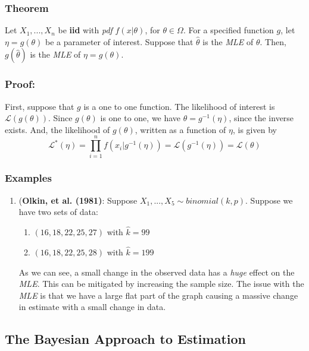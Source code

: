 \documentclass{article}
\begin{document}
\subsubsection{Theorem}
Let $X_1,...,X_n$ be \textbf{iid} with \textit{pdf} $f(x|\theta)$, for $\theta \in \Omega$. For a specified function $g$, let $\eta = g(\theta)$ be a parameter of interest. Suppose that $\hat{\theta}$ is the \textit{MLE} of $\theta$. Then, $g(\hat{\theta})$ is the \textit{MLE} of $\eta = g(\theta)$.

\subsubsection*{Proof:}
First, suppose that $g$ is a one to one function. The likelihood of interest is $\mathcal{L}\left(g(\theta) \right)$. Since $g(\theta)$ is one to one, we have $\theta = g^{-1}(\eta)$, since the inverse exists. And, the likelihood of $g(\theta)$, written as a function of $\eta$, is given by
\begin{equation*}
    \mathcal{L}^*(\eta) = \prod_{i=1}^n f\left(x_i|g^{-1}(\eta)\right) = \mathcal{L}\left(g^{-1}(\eta)\right) = \mathcal{L}(\theta)
\end{equation*}

\subsubsection{Examples}
\begin{enumerate}
    \item (\textbf{Olkin, et al. (1981)}: Suppose $X_1,...,X_5 \sim binomial(k,p)$. Suppose we have two sets of data: 
    \begin{enumerate}
        \item $(16,18,22,25,27)$ with $\hat{k} = 99$
        \item $(16,18,22,25,28)$ with $\hat{k} = 199$
    \end{enumerate}
    As we can see, a small change in the observed data has a \textit{huge} effect on the \textit{MLE}. This can be mitigated by increasing the sample size. The issue with the \textit{MLE} is that we have a large flat part of the graph causing a massive change in estimate with a small change in data.
\end{enumerate}

\subsection{The Bayesian Approach to Estimation}
\end{document}
